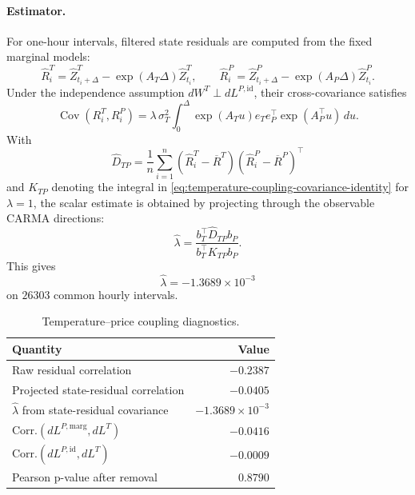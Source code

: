 \paragraph{Estimator.}
For one-hour intervals, filtered state residuals are computed from the fixed
marginal models:
\begin{equation}
  \widehat R_i^T
  =
  \widehat Z_{t_i+\Delta}^T
  -
  \exp(A_T\Delta)\widehat Z_{t_i}^T,
  \qquad
  \widehat R_i^P
  =
  \widehat Z_{t_i+\Delta}^P
  -
  \exp(A_P\Delta)\widehat Z_{t_i}^P .
  \label{eq:temperature-coupling-state-residuals}
\end{equation}
Under the independence assumption
\(dW^T\perp dL^{P,\mathrm{id}}\), their cross-covariance satisfies
\begin{equation}
  \operatorname{Cov}(R_i^T,R_i^P)
  =
  \lambda\,\sigma_T^2
  \int_0^\Delta
  \exp(A_Tu)e_T e_P^\top \exp(A_P^\top u)\,du .
  \label{eq:temperature-coupling-covariance-identity}
\end{equation}
With
\[
  \widehat D_{TP}
  =
  \frac{1}{n}\sum_{i=1}^{n}
  (\widehat R_i^T-\overline R^T)
  (\widehat R_i^P-\overline R^P)^\top
\]
and \(K_{TP}\) denoting the integral in
\cref{eq:temperature-coupling-covariance-identity} for \(\lambda=1\), the scalar
estimate is obtained by projecting through the observable CARMA directions:
\begin{equation}
  \widehat\lambda
  =
  \frac{b_T^\top \widehat D_{TP} b_P}
       {b_T^\top K_{TP} b_P}.
  \label{eq:temperature-coupling-lambda-estimator}
\end{equation}
This gives
\[
  \widehat\lambda = -1.3689\times 10^{-3}
\]
on \(26303\) common hourly intervals.

\begin{table}[H]
  \centering
  \caption{Temperature--price coupling diagnostics.}
  \label{tab:temperature-price-coupling-diagnostics}
  \begin{tabular}{@{}lr@{}}
    \toprule
    Quantity & Value \\
    \midrule
    Raw residual correlation & \(-0.2387\) \\
    Projected state-residual correlation & \(-0.0405\) \\
    \(\widehat\lambda\) from state-residual covariance & \(-1.3689{\times}10^{-3}\) \\
    Corr.\((dL^{P,\mathrm{marg}},dL^T)\) & \(-0.0416\) \\
    Corr.\((dL^{P,\mathrm{id}},dL^T)\) & \(-0.0009\) \\
    Pearson p-value after removal & \(0.8790\) \\
    \bottomrule
  \end{tabular}
\end{table}

